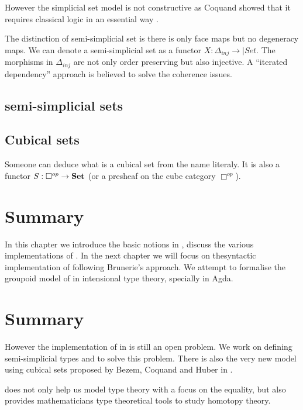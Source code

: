However the simplicial set model is not constructive as Coquand showed
that it requires classical logic in an essential way \cite{TC:sset}.


The distinction of semi-simplicial set is there is only face maps
but no degeneracy maps. We can denote a semi-simplicial set as a
functor $X : \Delta_{inj} \rightarrow |Set$. The morphisms in $\Delta_{inj}$ are not only order preserving
but also injective.
A “iterated dependency” approach is believed to solve the coherence
issues.


\subsection{semi-simplicial sets}





\subsection{Cubical sets}

Someone can deduce what is a cubical set from the name literaly. It is
also a functor $S : \Box^{op} \rightarrow \operatorname{\mathbf{Set}}$ (or a presheaf on the
cube category $ \Box^{op}$).

\section{Summary}

In this chapter we introduce the basic notions in \hott, discuss the
various implementations of \hott. In the next chapter we will focus on
thesyntactic implementation of \wog following
Brunerie's approach. We attempt to formalise the groupoid model of
\hott in intensional type theory, specially in Agda.




\section{Summary}






However the implementation of \hott in \itt is still an open problem. We
work on defining semi-simplicial types and \wog to solve this problem. There
is also the very new model using cubical sets proposed by Bezem,
Coquand and Huber in \cite{bezem2013model}.



\hott does not only help us model type theory with a focus on the equality, but also provides mathematicians type theoretical tools to study homotopy theory.

